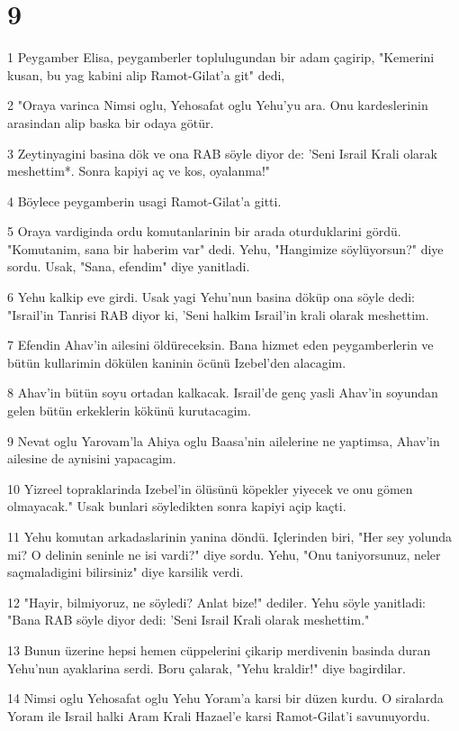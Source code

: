 \chapter{9}

\par 1 Peygamber Elisa, peygamberler toplulugundan bir adam çagirip, "Kemerini kusan, bu yag kabini alip Ramot-Gilat'a git" dedi,
\par 2 "Oraya varinca Nimsi oglu, Yehosafat oglu Yehu'yu ara. Onu kardeslerinin arasindan alip baska bir odaya götür.
\par 3 Zeytinyagini basina dök ve ona RAB söyle diyor de: 'Seni Israil Krali olarak meshettim*. Sonra kapiyi aç ve kos, oyalanma!"
\par 4 Böylece peygamberin usagi Ramot-Gilat'a gitti.
\par 5 Oraya vardiginda ordu komutanlarinin bir arada oturduklarini gördü. "Komutanim, sana bir haberim var" dedi. Yehu, "Hangimize söylüyorsun?" diye sordu. Usak, "Sana, efendim" diye yanitladi.
\par 6 Yehu kalkip eve girdi. Usak yagi Yehu'nun basina döküp ona söyle dedi: "Israil'in Tanrisi RAB diyor ki, 'Seni halkim Israil'in krali olarak meshettim.
\par 7 Efendin Ahav'in ailesini öldüreceksin. Bana hizmet eden peygamberlerin ve bütün kullarimin dökülen kaninin öcünü Izebel'den alacagim.
\par 8 Ahav'in bütün soyu ortadan kalkacak. Israil'de genç yasli Ahav'in soyundan gelen bütün erkeklerin kökünü kurutacagim.
\par 9 Nevat oglu Yarovam'la Ahiya oglu Baasa'nin ailelerine ne yaptimsa, Ahav'in ailesine de aynisini yapacagim.
\par 10 Yizreel topraklarinda Izebel'in ölüsünü köpekler yiyecek ve onu gömen olmayacak." Usak bunlari söyledikten sonra kapiyi açip kaçti.
\par 11 Yehu komutan arkadaslarinin yanina döndü. Içlerinden biri, "Her sey yolunda mi? O delinin seninle ne isi vardi?" diye sordu. Yehu, "Onu taniyorsunuz, neler saçmaladigini bilirsiniz" diye karsilik verdi.
\par 12 "Hayir, bilmiyoruz, ne söyledi? Anlat bize!" dediler. Yehu söyle yanitladi: "Bana RAB söyle diyor dedi: 'Seni Israil Krali olarak meshettim."
\par 13 Bunun üzerine hepsi hemen cüppelerini çikarip merdivenin basinda duran Yehu'nun ayaklarina serdi. Boru çalarak, "Yehu kraldir!" diye bagirdilar.
\par 14 Nimsi oglu Yehosafat oglu Yehu Yoram'a karsi bir düzen kurdu. O siralarda Yoram ile Israil halki Aram Krali Hazael'e karsi Ramot-Gilat'i savunuyordu.
